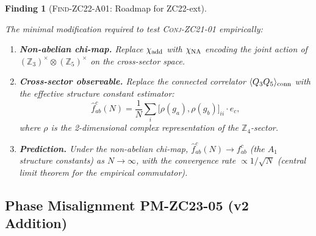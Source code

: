 \documentclass[12pt, a4paper]{article}
\newtheorem{finding}{Finding}[section]
\begin{document}
\begin{finding}[\textsc{Find-ZC22-A01}: Roadmap for ZC22-ext]
\label{zc22:find:roadmap}
\begin{keybox}[title={Roadmap: ZC22-ext Architecture}]
The minimal modification required to test \textsc{Conj-ZC21-01} empirically:

\begin{enumerate}[leftmargin=*, noitemsep]
  \item \textbf{Non-abelian chi-map.}
    Replace $\chi_{\rm add}$ with $\chi_{\rm NA}$
    encoding the joint action of
    $(\mathbb{Z}_3)^\times \otimes (\mathbb{Z}_5)^\times$
    on the cross-sector space.
  \item \textbf{Cross-sector observable.}
    Replace the connected correlator $\langle Q_3 Q_5\rangle_{\rm conn}$
    with the effective structure constant estimator:
    \begin{equation*}
      \hat{f}_{ab}^c(N) = \frac{1}{N}
      \sum_{i} \bigl[\rho(g_a),\rho(g_b)\bigr]_{ii}
      \cdot e_c,
    \end{equation*}
    where $\rho$ is the 2-dimensional complex representation
    of the $\mathbb{Z}_4$-sector.
  \item \textbf{Prediction.}
    Under the non-abelian chi-map,
    $\hat{f}_{ab}^c(N) \to f_{ab}^c$ (the $A_1$ structure constants)
    as $N \to \infty$,
    with the convergence rate $\propto 1/\sqrt{N}$
    (central limit theorem for the empirical commutator).
\end{enumerate}
\end{keybox}
\end{finding}

\subsection{Phase Misalignment PM-ZC23-05 (v2 Addition)}
\label{zc22:sec:pm2305}
\end{document}
